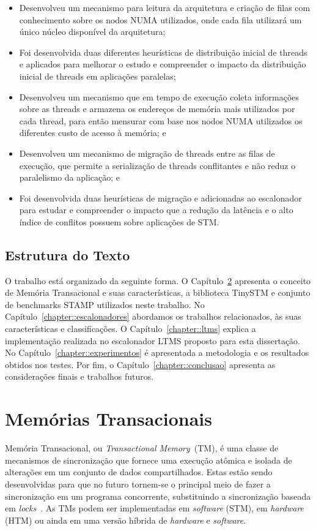 \documentclass[diss,capa]{texufpel}
\begin{document}
\begin{itemize}
 \item Desenvolveu um mecanismo para leitura da arquitetura e criação de filas com conhecimento sobre os nodos NUMA utilizados, onde cada fila utilizará um único núcleo disponível da arquitetura;
 \item Foi desenvolvida duas diferentes heurísticas de distribuição inicial de threads e aplicados para melhorar o estudo e compreender o impacto da distribuição inicial de threads em aplicações paralelas;
 \item  Desenvolveu um mecanismo que em tempo de execução coleta informações sobre as threads e armazena os endereços de memória mais utilizados por cada thread, para então mensurar com base nos nodos NUMA utilizados os diferentes custo de acesso à memória; e
 \item Desenvolveu um mecanismo de migração de threads entre as filas de execução, que permite a serialização de threads conflitantes e não reduz o paralelismo da aplicação; e
 \item Foi desenvolvida duas heurísticas de migração e adicionadas ao escalonador para estudar e compreender o impacto que a redução da latência e o alto índice de conflitos possuem sobre aplicações de STM.
\end{itemize}

\section{Estrutura do Texto}

O trabalho está organizado da seguinte forma. O Capítulo~\ref{chapter::stm} apresenta o conceito de Memória Transacional e suas características, a biblioteca TinySTM e conjunto de benchmarks STAMP utilizados neste trabalho. No Capítulo~\ref{chapter::escalonadores} abordamos os trabalhos relacionados, às suas características e classificações. O Capítulo~\ref{chapter::ltms} explica a implementação realizada no escalonador LTMS proposto para esta dissertação. No Capítulo~\ref{chapter::experimentos} é apresentada a metodologia e os resultados obtidos nos testes. Por fim, o Capítulo~\ref{chapter::conclusao} apresenta as considerações finais e trabalhos futuros.

\chapter{Memórias Transacionais}
\label{chapter::stm}

Memória Transacional, ou \emph{Transactional Memory}~(TM), é uma classe de mecanismos de sincronização que fornece uma execução atômica e isolada de alterações em um conjunto de dados compartilhados. Estas estão sendo desenvolvidas para que no futuro tornem-se o principal meio de fazer a sincronização em um programa concorrente, substituindo a sincronização baseada em \emph{locks}~\cite{energyawaretm}. As TMs podem ser implementadas em \emph{software} (STM), em \emph{hardware} (HTM) ou ainda em uma versão híbrida de \emph{hardware} e \emph{software}.
\end{document}
